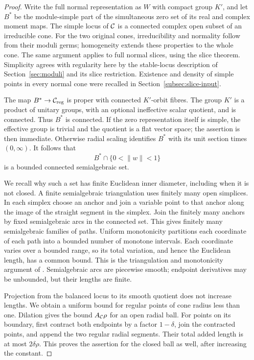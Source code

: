 \begin{proof}
Write the full normal representation as $W$ with compact
group $K'$, and let $B^*$ be the module-simple part of the
simultaneous zero set of its real and complex moment maps.
The simple locus of $\mathcal C$ is a connected complex open
subset of an irreducible cone. For the two original cones,
irreducibility and normality follow from their moduli germs;
homogeneity extends these properties to the whole cone.
The same argument applies to full normal slices, using the
slice theorem. Simplicity agrees with regularity here by
the stable-locus description of Section~\ref{sec:moduli}
and its slice restriction. Existence and density of simple
points in every normal cone were recalled in
Section~\ref{subsec:slice-input}.

The map $B^*\to\mathcal C_{\mathrm{reg}}$ is proper with connected
$K'$-orbit fibres. The group $K'$ is a product of unitary
groups, with an optional ineffective scalar quotient, and
is connected. Thus $B^*$ is connected. If the zero
representation itself is simple, the effective group is
trivial and the quotient is a flat vector space; the
assertion is then immediate. Otherwise radial scaling
identifies $B^*$ with its unit section times $(0,\infty)$.
It follows that
\[
 B^*\cap\{0<\|w\|<1\}
\]
is a bounded connected semialgebraic set.

We recall why such a set has finite Euclidean inner diameter,
including when it is not closed. A finite semialgebraic
triangulation uses finitely many open simplices. In each
simplex choose an anchor and join a variable point to that
anchor along the image of the straight segment in the
simplex. Join the finitely many anchors by fixed
semialgebraic arcs in the connected set. This gives finitely
many semialgebraic families of paths. Uniform monotonicity
partitions each coordinate of each path into a bounded
number of monotone intervals. Each coordinate varies over
a bounded range, so its total variation, and hence the
Euclidean length, has a common bound. This is the
triangulation and monotonicity argument of
\cite[Sections~2 and~3, especially Theorem~3.4]{vdd98}.
Semialgebraic arcs are piecewise smooth; endpoint derivatives
may be unbounded, but their lengths are finite.

Projection from the balanced locus to its smooth quotient
does not increase lengths. We obtain a uniform bound for
regular points of cone radius less than one. Dilation gives
the bound $A_\mathcal C\rho$ for an open radial ball. For points
on its boundary, first contract both endpoints by a factor
$1-\delta$, join the contracted points, and append the two
regular radial segments. Their total added length is at
most $2\delta\rho$. This proves the assertion for the
closed ball as well, after increasing the constant.
\end{proof}


